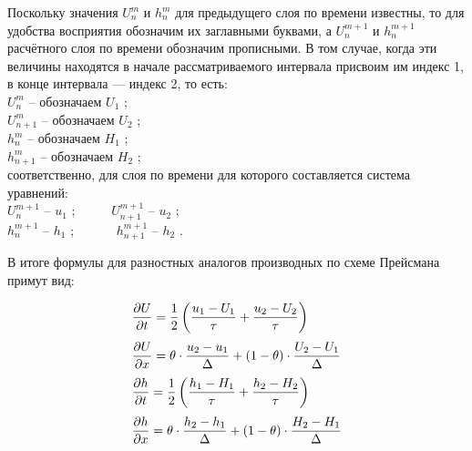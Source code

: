 Поскольку значения $ U_n^m $ и $ h_n^m $ для предыдущего слоя по времени известны, то для удобства восприятия обозначим их заглавными буквами, а $ U_n^{m+1} $ и $ h_n^{m+1} $ расчётного слоя по времени обозначим прописными. В том случае, когда эти величины находятся в начале рассматриваемого интервала присвоим им индекс 1, в конце интервала --- индекс 2, то есть: \\

$ U_n^m $ -- обозначаем $ U_1 $ ;\\

$ U_{n+1}^m $ -- обозначаем $ U_2 $ ;\\

$ h_n^m $  -- обозначаем $ H_1 $ ;\\

$ h_{n+1}^m $  -- обозначаем $ H_2 $ ;\\

\noindent соответственно, для слоя по времени для которого составляется система уравнений:\\

 $ U_n^{m+1} $ -- $ u_1 $ ; \ \ \ \ \ $ U_{n+1}^{m+1} $ -- $ u_2 $ ;\\

$ h_n^{m+1} $ -- $ h_1 $ ; \ \ \ \ \ \ $ h_{n+1}^{m+1} $  -- $ h_2 $ .\\

\newpage

В итоге формулы для разностных аналогов производных по схеме Прейсмана примут вид:

\begin{equation}
   \label{eq_PreismannMod}
   \begin{array}{ll}
      \vspace{7pt}
      \displaystyle \frac{\partial U}{\partial t} = \frac{1}{2} \left( \frac{u_1- U_1}{\tau} + \frac{u_2- U_2}{\tau}\right)  \\
      \vspace{7pt}
      \displaystyle \frac{\partial U}{\partial x} = \theta \cdot \frac{u_2 - u_1} {\Delta} + (1-\theta) \cdot \frac{U_2- U_1 }{\Delta} \\
      \vspace{7pt}
      \displaystyle \frac{\partial h}{\partial t} = \frac{1}{2} \left( \frac{h_1- H_1}{\tau} + \frac{h_2- H_2}{\tau}\right)  \\
      \vspace{7pt}
      \displaystyle \frac{\partial h}{\partial x} = \theta \cdot \frac{h_2 - h_1} {\Delta} + (1-\theta) \cdot \frac{H_2 - H_1 }{\Delta}
   \end{array} 
\end{equation}

